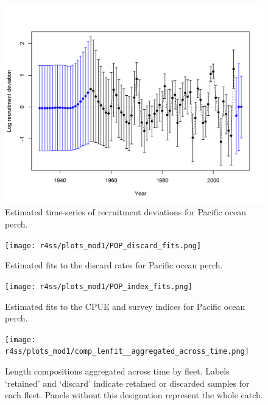 \documentclass[12pt,]{article}
\begin{document}
\begin{figure}
\centering
\includegraphics{r4ss/plots_mod1/recdevs2_withbars.png}
\caption{Estimated time-series of recruitment deviations for Pacific
ocean perch. \label{fig:recdevs}}
\end{figure}

\FloatBarrier

\begin{figure}
\centering
\texttt{[image: r4ss/plots\_mod1/POP\_discard\_fits.png]}
\caption{Estimated fits to the discard rates for Pacific ocean perch.
\label{fig:discard_fits}}
\end{figure}

\FloatBarrier 

\begin{figure}
\centering
\texttt{[image: r4ss/plots\_mod1/POP\_index\_fits.png]}
\caption{Estimated fits to the CPUE and survey indices for Pacific ocean
perch. \label{fig:index_fits}}
\end{figure}

\FloatBarrier 

\begin{figure}
\centering
\texttt{[image: r4ss/plots\_mod1/comp\_lenfit\_\_aggregated\_across\_time.png]}
\caption{Length compositions aggregated across time by fleet. Labels
`retained' and `discard' indicate retained or discarded samples for each
fleet. Panels without this designation represent the whole catch.
\label{fig:length_agg}}
\end{figure}
\end{document}

